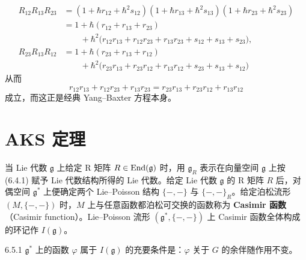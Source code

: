 \[
\begin{aligned}
R_{12}R_{13}R_{23}
  &= (1+\hbar r_{12}+\hbar^2 s_{12})(1+\hbar r_{13}+\hbar^2 s_{13})(1+\hbar r_{23}+\hbar^2 s_{23}) \\
  &= 1 + \hbar(r_{12}+r_{13}+r_{23}) \\
  &\qquad + \hbar^2\bigl(r_{12}r_{13} + r_{12}r_{23} + r_{13}r_{23} + s_{12} + s_{13} + s_{23}\bigr), \\
R_{23}R_{13}R_{12}
  &= 1 + \hbar(r_{23}+r_{13}+r_{12}) \\
  &\qquad + \hbar^2\bigl(r_{23}r_{13} + r_{23}r_{12} + r_{13}r_{12} + s_{23} + s_{13} + s_{12}\bigr)
\end{aligned}
\]
从而
\begin{equation}
  r_{12}r_{13} + r_{12}r_{23} + r_{13}r_{23}
  = r_{23}r_{13} + r_{23}r_{12} + r_{13}r_{12}
  \tag{6.4.35}
\end{equation}
成立，而这正是经典 Yang--Baxter 方程本身。

\section{AKS 定理}

当 Lie 代数 $\mathfrak{g}$ 上给定 R 矩阵 $R\in\operatorname{End}(\mathfrak{g})$ 时，用 $\mathfrak{g}_R$ 表示在向量空间 $\mathfrak{g}$ 上按 (6.4.1) 赋予 Lie 代数结构所得的 Lie 代数。给定 Lie 代数 $\mathfrak{g}$ 的 R 矩阵 $R$ 后，对偶空间 $\mathfrak{g}^*$ 上便确定两个 Lie--Poisson 结构 $\{-,-\}$ 与 $\{-,-\}_R$。给定泊松流形 $(M,\{-,-\})$ 时，$M$ 上与任意函数都泊松可交换的函数称为 \textbf{Casimir 函数}（Casimir function）。Lie--Poisson 流形 $(\mathfrak{g}^*,\{-,-\})$ 上 Casimir 函数全体构成的环记作 $I(\mathfrak{g})$。


\begin{proposition*}{6.5.1}
  $\mathfrak{g}^*$ 上的函数 $\varphi$ 属于 $I(\mathfrak{g})$ 的充要条件是：$\varphi$ 关于 $G$ 的余伴随作用不变。
\end{proposition*}

